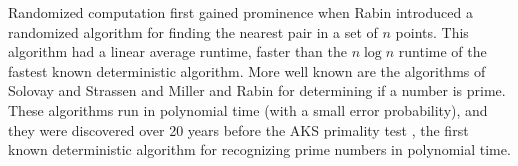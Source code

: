 Randomized computation first gained prominence when Rabin \cite{international1976probabilistic} introduced a randomized algorithm for finding the nearest pair in a set of $n$ points.  This algorithm had a linear average runtime, faster than the $n \log n$ runtime of the fastest known deterministic algorithm.  More well known are the algorithms of Solovay and Strassen \cite{solovay1977fast} and Miller and Rabin \cite{rabin1980probabilistic} for determining if a number is prime.  These algorithms run in polynomial time (with a small error probability), and they were discovered over 20 years before the AKS primality test \cite{agrawal2004primes}, the first known deterministic algorithm for recognizing prime numbers in polynomial time. 